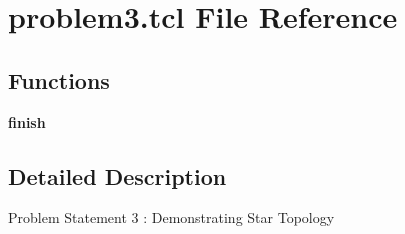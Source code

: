 \hypertarget{problem3_8tcl}{}\section{problem3.\+tcl File Reference}
\label{problem3_8tcl}
\subsection*{Functions}
\begin{DoxyCompactItemize}
\item 
\mbox{\label{problem3_8tcl_a30728837c246b65ef76298af0101d99c}} 
{\bfseries finish}
\end{DoxyCompactItemize}


\subsection{Detailed Description}
Problem Statement 3 \+: Demonstrating Star Topology

\begin{DoxyVerb}
\end{DoxyVerb}
